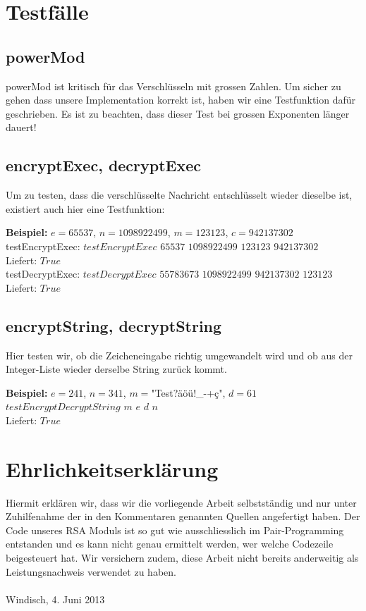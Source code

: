 \documentclass[a4paper, 11pt]{article} %
\begin{document}
\section{Testfälle}
\subsection{powerMod}
powerMod ist kritisch für das Verschlüsseln mit grossen Zahlen. Um sicher zu gehen dass unsere Implementation korrekt ist, haben wir eine Testfunktion dafür geschrieben. Es ist zu beachten, dass dieser Test bei grossen Exponenten länger dauert!


\subsection{encryptExec, decryptExec}
Um zu testen, dass die verschlüsselte Nachricht entschlüsselt wieder dieselbe ist, existiert auch hier eine Testfunktion:

\textbf{Beispiel:} $e=65537$, $n=1098922499$, $m=123123$, $c=942137302$\\
testEncryptExec: $testEncryptExec$ $65537$ $1098922499$ $123123$ $942137302$\\
Liefert: $True$\\
testDecryptExec: $testDecryptExec$ $55783673$ $1098922499$ $942137302$ $123123$\\
Liefert: $True$

\subsection{encryptString, decryptString}
Hier testen wir, ob die Zeicheneingabe richtig umgewandelt wird und ob aus der Integer-Liste wieder derselbe String zurück kommt.

\textbf{Beispiel:} $e=241$, $n=341$, $m=$"Test?äöü!\_-+ç", $d=61$\\
$testEncryptDecryptString$ $m$ $e$ $d$ $n$\\
Liefert: $True$

\section{Ehrlichkeitserklärung}
Hiermit erklären wir, dass wir die vorliegende Arbeit selbstständig und nur unter Zuhilfenahme der in den Kommentaren genannten Quellen angefertigt haben. Der Code unseres RSA Moduls ist so gut wie ausschliesslich im Pair-Programming entstanden und es kann nicht genau ermittelt werden, wer welche Codezeile beigesteuert hat. Wir versichern zudem, diese Arbeit nicht bereits anderweitig als Leistungsnachweis verwendet zu haben.\\\\
Windisch, 4. Juni 2013
\end{document}
